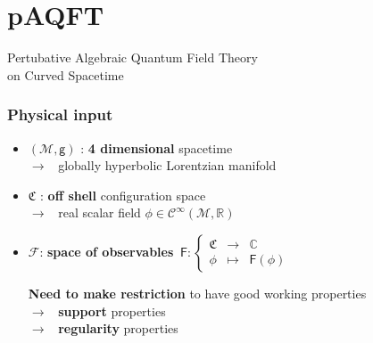 \documentclass[9pt]{beamer}
\newcommand{\Ccal}{\mathcal{C}}
\newcommand{\Fcal}{\mathcal{F}}
\newcommand{\Mcal}{\mathcal{M}}
\newcommand{\Cbb}{\mathbb{C}}
\newcommand{\Rbb}{\mathbb{R}}
\newcommand{\Crak}{\mathfrak{C}}
\newcommand{\Fsf}{\mathsf{F}}
\newcommand{\gsf}{\mathsf{g}}
\begin{document}
\section{pAQFT}

{%
%
% 
%
%
%
\begin{frame}%
\bf
\vspace*{30pt}
%
\begin{exampleblock}{\vspace*{-3ex}}%
%
\begin{center}%
%
\Large Pertubative Algebraic Quantum Field Theory \\[10pt] on Curved Spacetime
%
\end{center}%
%
\end{exampleblock}%
%
\end{frame}
%
}%


\begin{frame}

\frametitle{Physical input}
  
\begin{itemize}
  
\item $(\Mcal,\gsf)$ : \textbf{4 dimensional} spacetime \\[2pt]
\qquad $\to$ \ globally hyperbolic Lorentzian manifold
    
\item $\Crak$ : \textbf{off shell} configuration space \\[2pt] 
\qquad $\to$ \ real scalar field $\phi \in \Ccal^\infty(\Mcal,\Rbb)$
        
\item $\Fcal$: \textbf{space of observables}
$
\ \Fsf : \left\{
\begin{array}{ccc}
\Crak & \to & \Cbb \\
\phi & \mapsto & \Fsf(\phi)
\end{array}
\right.
$
   
\vspace*{16pt}
   
\textbf{Need to make restriction} to have good working properties \\[5pt]

\qquad $\to$ \ \textbf{support} properties \\[3pt]
 
\qquad $\to$ \ \textbf{regularity} properties

\end{itemize}

\end{frame}  
\end{document}
